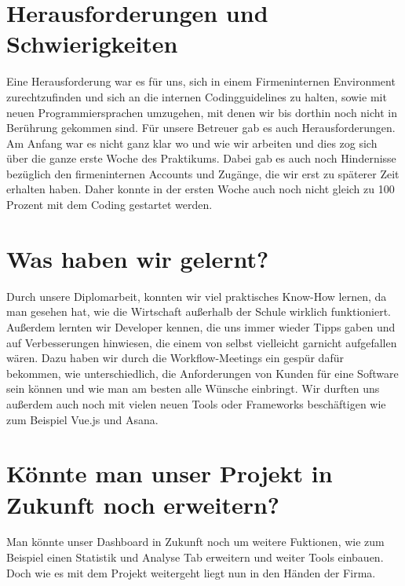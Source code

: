 \section{Herausforderungen und Schwierigkeiten}

Eine Herausforderung war es für uns, sich in einem Firmeninternen Environment zurechtzufinden und sich an die internen Codingguidelines zu halten, sowie mit neuen Programmiersprachen umzugehen, mit denen wir bis dorthin noch nicht in Berührung gekommen sind.
Für unsere Betreuer gab es auch Herausforderungen.
Am Anfang war es nicht ganz klar wo und wie wir arbeiten und dies zog sich über die ganze erste Woche des Praktikums.
Dabei gab es auch noch Hindernisse bezüglich den firmeninternen Accounts und Zugänge, die wir erst zu späterer Zeit erhalten haben.
Daher konnte in der ersten Woche auch noch nicht gleich zu 100 Prozent mit dem Coding gestartet werden.

\section{Was haben wir gelernt?}

Durch unsere Diplomarbeit, konnten wir viel praktisches Know-How lernen, da man gesehen hat, wie die Wirtschaft außerhalb der Schule wirklich funktioniert.
Außerdem lernten wir Developer kennen, die uns immer wieder Tipps gaben und auf Verbesserungen hinwiesen, die einem von selbst vielleicht garnicht aufgefallen wären.
Dazu haben wir durch die Workflow-Meetings ein gespür dafür bekommen, wie unterschiedlich, die Anforderungen von Kunden für eine Software sein können und wie man am besten alle Wünsche einbringt.
Wir durften uns außerdem auch noch mit vielen neuen Tools oder Frameworks beschäftigen wie zum Beispiel Vue.js und Asana.


\section{Könnte man unser Projekt in Zukunft noch erweitern?}

Man könnte unser Dashboard in Zukunft noch um weitere Fuktionen, wie zum Beispiel einen Statistik und Analyse Tab erweitern und weiter Tools einbauen.
Doch wie es mit dem Projekt weitergeht liegt nun in den Händen der Firma.